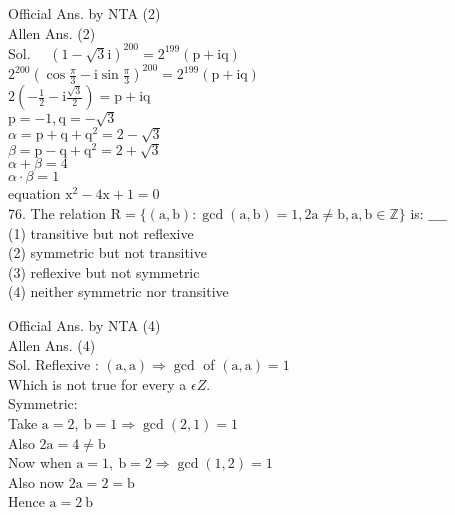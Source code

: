 \documentclass[10pt]{article}
\begin{document}
Official Ans. by NTA (2)\\
Allen Ans. (2)\\
Sol. \(\quad(1-\sqrt{3} \mathrm{i})^{200}=2^{199}(\mathrm{p}+\mathrm{iq})\)\\
\(2^{200}\left(\cos \frac{\pi}{3}-\mathrm{i} \sin \frac{\pi}{3}\right)^{200}=2^{199}(\mathrm{p}+\mathrm{iq})\)\\
\(2\left(-\frac{1}{2}-\mathrm{i} \frac{\sqrt{3}}{2}\right)=\mathrm{p}+\mathrm{iq}\)\\
\(\mathrm{p}=-1, \mathrm{q}=-\sqrt{3}\)\\
\(\alpha=\mathrm{p}+\mathrm{q}+\mathrm{q}^{2}=2-\sqrt{3}\)\\
\(\beta=\mathrm{p}-\mathrm{q}+\mathrm{q}^{2}=2+\sqrt{3}\)\\
\(\alpha+\beta=4\)\\
\(\alpha \cdot \beta=1\)\\
equation \(\mathrm{x}^{2}-4 \mathrm{x}+1=0\)\\
76. The relation \(\mathrm{R}=\{(\mathrm{a}, \mathrm{b}): \operatorname{gcd}(\mathrm{a}, \mathrm{b})=1,2 \mathrm{a} \neq \mathrm{b}, \mathrm{a}, \mathrm{b} \in \mathbb{Z}\}\) is: \(\_\_\_\_\)\\
(1) transitive but not reflexive\\
(2) symmetric but not transitive\\
(3) reflexive but not symmetric\\
(4) neither symmetric nor transitive

Official Ans. by NTA (4)\\
Allen Ans. (4)\\
Sol. Reflexive : \((\mathrm{a}, \mathrm{a}) \Rightarrow \operatorname{gcd}\) of \((\mathrm{a}, \mathrm{a})=1\)\\
Which is not true for every a \(\epsilon Z\).\\
Symmetric:\\
Take \(\mathrm{a}=2, \mathrm{~b}=1 \Rightarrow \operatorname{gcd}(2,1)=1\)\\
Also \(2 \mathrm{a}=4 \neq \mathrm{b}\)\\
Now when \(\mathrm{a}=1, \mathrm{~b}=2 \Rightarrow \operatorname{gcd}(1,2)=1\)\\
Also now \(2 \mathrm{a}=2=\mathrm{b}\)\\
Hence \(\mathrm{a}=2 \mathrm{~b}\)
\end{document}

